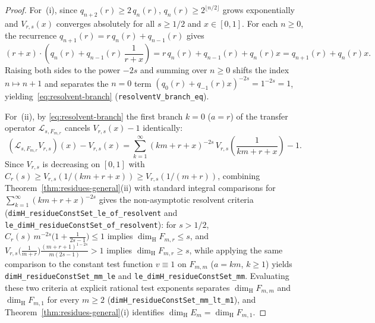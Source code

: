 \documentclass[11pt]{article}
\theoremstyle{definition}
\theoremstyle{remark}
\newcommand{\dimH}{\dim_{\mathrm{H}}}
\begin{document}
\begin{proof}
For~(i), since $q_{n+2}(r)\ge 2\,q_n(r)$, $q_n(r)\ge 2^{\lfloor n/2\rfloor}$ grows
exponentially and $V_{r,s}(x)$ converges absolutely for all $s\ge1/2$ and $x\in[0,1]$.
For each $n\ge0$, the recurrence $q_{n+1}(r)=r\,q_n(r)+q_{n-1}(r)$ gives
\[
(r+x)\cdot\left(q_n(r)+q_{n-1}(r)\,\frac{1}{r+x}\right)
=r\,q_n(r)+q_{n-1}(r)+q_n(r)x
=q_{n+1}(r)+q_n(r)x.
\]
Raising both sides to the power $-2s$ and summing over $n\ge0$ shifts the index
$n\mapsto n+1$ and separates the $n=0$ term $(q_0(r)+q_{-1}(r)x)^{-2s}=1^{-2s}=1$,
yielding~\eqref{eq:resolvent-branch} (\texttt{resolventV\_\allowbreak branch\_\allowbreak eq}).

For~(ii), by \eqref{eq:resolvent-branch} the first branch $k=0$ ($a=r$) of the
transfer operator $\mathcal L_{s,F_{m,r}}$ cancels $V_{r,s}(x)-1$ identically:
\[
(\mathcal L_{s,F_{m,r}}V_{r,s})(x)-V_{r,s}(x)
=\sum_{k=1}^\infty(km+r+x)^{-2s}\,V_{r,s}\!\left(\frac{1}{km+r+x}\right)-1.
\]
Since $V_{r,s}$ is decreasing on $[0,1]$ with $C_r(s)\ge V_{r,s}(1/(km+r+x))\ge V_{r,s}(1/(m+r))$,
combining Theorem~\ref{thm:residues-general}(ii) with standard integral comparisons for
$\sum_{k=1}^\infty(km+r+x)^{-2s}$ gives the non-asymptotic resolvent criteria
(\texttt{dimH\_\allowbreak residueConstSet\_\allowbreak le\_\allowbreak of\_\allowbreak resolvent}
and \texttt{le\_\allowbreak dimH\_\allowbreak residueConstSet\_\allowbreak of\_\allowbreak resolvent}):
for $s>1/2$, $C_r(s)\,m^{-2s}\bigl(1+\frac{1}{2s-1}\bigr)\le 1$ implies $\dimH F_{m,r}\le s$,
and $V_{r,s}\bigl(\frac{1}{m+r}\bigr)\frac{(m+r+1)^{1-2s}}{m(2s-1)}>1$ implies $\dimH F_{m,r}\ge s$,
while applying the same comparison to the constant test function $v\equiv 1$ on
$F_{m,m}$ ($a=km$, $k\ge1$) yields \texttt{dimH\_\allowbreak residueConstSet\_\allowbreak mm\_\allowbreak le}
and \texttt{le\_\allowbreak dimH\_\allowbreak residueConstSet\_\allowbreak mm}.
Evaluating these two criteria at explicit rational test exponents separates
$\dimH F_{m,m}$ and $\dimH F_{m,1}$ for every $m\ge2$
(\texttt{dimH\_\allowbreak residueConstSet\_\allowbreak mm\_\allowbreak lt\_\allowbreak m1}),
and Theorem~\ref{thm:residues-general}(i) identifies $\dimH E_m=\dimH F_{m,1}$.


\end{proof}
\end{document}
